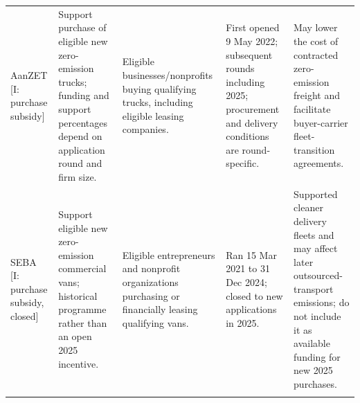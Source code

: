 \documentclass[10pt,a4paper,landscape]{article}
\begin{document}
\begin{tabularx}{\textwidth}{Y{0.85}Y{1.00}Y{0.85}Y{1.05}Y{1.25}}
\addlinespace[5pt]
AanZET [I: purchase subsidy]\cite{nlaanzet,nlaanzetstart} & Support purchase of eligible new zero-emission trucks; funding and support percentages depend on application round and firm size. & Eligible businesses/nonprofits buying qualifying trucks, including eligible leasing companies. & First opened 9 May 2022; subsequent rounds including 2025; procurement and delivery conditions are round-specific. & May lower the cost of contracted zero-emission freight and facilitate buyer-carrier fleet-transition agreements. \\
\addlinespace[5pt]
SEBA [I: purchase subsidy, closed]\cite{nlseba} & Support eligible new zero-emission commercial vans; historical programme rather than an open 2025 incentive. & Eligible entrepreneurs and nonprofit organizations purchasing or financially leasing qualifying vans. & Ran 15 Mar 2021 to 31 Dec 2024; closed to new applications in 2025. & Supported cleaner delivery fleets and may affect later outsourced-transport emissions; do not include it as available funding for new 2025 purchases. \\
\addlinespace[5pt]
\end{tabularx}
\normalsize

\clearpage
\end{document}
